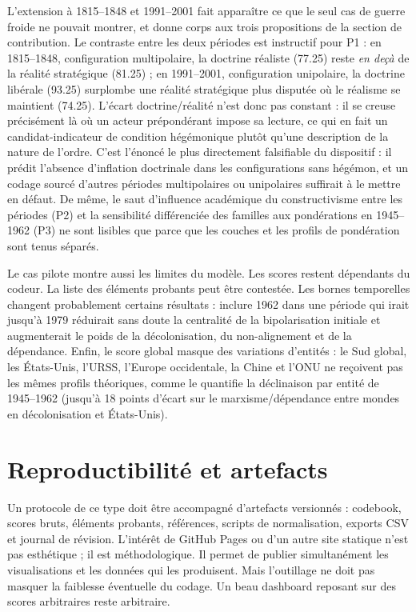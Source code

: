 \documentclass[11pt,a4paper]{article}
\begin{document}
L'extension à 1815--1848 et 1991--2001 fait apparaître ce que le seul cas de guerre froide ne pouvait montrer, et donne corps aux trois propositions de la section de contribution. Le contraste entre les deux périodes est instructif pour P1 : en 1815--1848, configuration multipolaire, la doctrine réaliste (77.25) reste \emph{en deçà} de la réalité stratégique (81.25) ; en 1991--2001, configuration unipolaire, la doctrine libérale (93.25) surplombe une réalité stratégique plus disputée où le réalisme se maintient (74.25). L'écart doctrine/réalité n'est donc pas constant : il se creuse précisément là où un acteur prépondérant impose sa lecture, ce qui en fait un candidat-indicateur de condition hégémonique plutôt qu'une description de la nature de l'ordre. C'est l'énoncé le plus directement falsifiable du dispositif : il prédit l'absence d'inflation doctrinale dans les configurations sans hégémon, et un codage sourcé d'autres périodes multipolaires ou unipolaires suffirait à le mettre en défaut. De même, le saut d'influence académique du constructivisme entre les périodes (P2) et la sensibilité différenciée des familles aux pondérations en 1945--1962 (P3) ne sont lisibles que parce que les couches et les profils de pondération sont tenus séparés.

Le cas pilote montre aussi les limites du modèle. Les scores restent dépendants du codeur. La liste des éléments probants peut être contestée. Les bornes temporelles changent probablement certains résultats : inclure 1962 dans une période qui irait jusqu'à 1979 réduirait sans doute la centralité de la bipolarisation initiale et augmenterait le poids de la décolonisation, du non-alignement et de la dépendance. Enfin, le score global masque des variations d'entités : le Sud global, les États-Unis, l'URSS, l'Europe occidentale, la Chine et l'ONU ne reçoivent pas les mêmes profils théoriques, comme le quantifie la déclinaison par entité de 1945--1962 (jusqu'à 18 points d'écart sur le marxisme/dépendance entre mondes en décolonisation et États-Unis).

\section{Reproductibilité et artefacts}

Un protocole de ce type doit être accompagné d'artefacts versionnés : codebook, scores bruts, éléments probants, références, scripts de normalisation, exports CSV et journal de révision. L'intérêt de GitHub Pages ou d'un autre site statique n'est pas esthétique ; il est méthodologique. Il permet de publier simultanément les visualisations et les données qui les produisent. Mais l'outillage ne doit pas masquer la faiblesse éventuelle du codage. Un beau dashboard reposant sur des scores arbitraires reste arbitraire.
\end{document}
